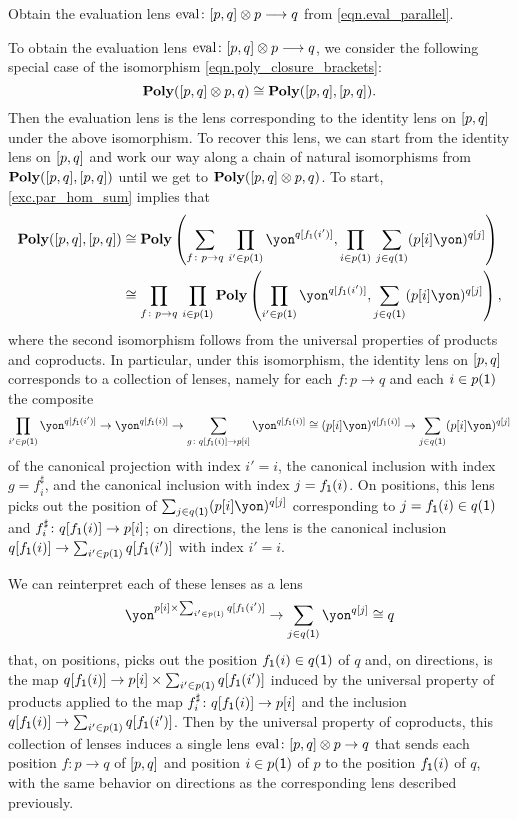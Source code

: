 \documentclass[Book-Poly]{subfiles}
\begin{document}
\begin{exercise} \label{exc.eval_parallel}
Obtain the evaluation lens $\mathrm{eval}\colon [p,q]\otimes p\longrightarrow q$ from \eqref{eqn.eval_parallel}.
\begin{solution}
To obtain the evaluation lens $\mathrm{eval}\colon [p,q]\otimes p\longrightarrow q$, we consider the following special case of the isomorphism \eqref{eqn.poly_closure_brackets}:
\[
    \mathbf{Poly}([p,q] \otimes p, q) \cong \mathbf{Poly}([p,q], [p,q]).
\]
Then the evaluation lens is the lens corresponding to the identity lens on $[p,q]$ under the above isomorphism.
To recover this lens, we can start from the identity lens on $[p,q]$ and work our way along a chain of natural isomorphisms from $\mathbf{Poly}([p,q], [p,q])$ until we get to $\mathbf{Poly}([p,q] \otimes p, q)$.
To start, \cref{exc.par_hom_sum} implies that
\begin{align*}
    \poly(\ihom{p,q}, \ihom{p,q})
    &\iso
    \poly\left(\sum_{f \colon p \to q} \, \prod_{i' \in p(\1)} \yon^{q[f_\1(i')]}, \prod_{i \in p(\1)} \, \sum_{j \in q(\1)} (p[i]\yon)^{q[j]}\right) \\
    &\iso
    \prod_{f \colon p \to q} \, \prod_{i \in p(\1)} \poly\left(\prod_{i' \in p(\1)} \yon^{q[f_\1(i')]}, \sum_{j \in q(\1)} (p[i]\yon)^{q[j]}\right),
\end{align*}
where the second isomorphism follows from the universal properties of products and coproducts.
In particular, under this isomorphism, the identity lens on $[p,q]$ corresponds to a collection of lenses, namely for each $f \colon p \to q$ and each $i \in p(\textsf{1})$ the composite
\[
    \prod_{i' \in p(\1)} \yon^{q[f_\1(i')]} \to \yon^{q[f_\1(i)]} \to \sum_{g \colon q[f_\1(i)] \to p[i]} \yon^{q[f_\1(i)]} \iso (p[i]\yon)^{q[f_\1(i)]} \to \sum_{j \in q(\1)} (p[i]\yon)^{q[j]}
\]
of the canonical projection with index $i' = i$, the canonical inclusion with index $g = f^\sharp_i$, and the canonical inclusion with index $j = f_{\textsf{1}}(i)$.
On positions, this lens picks out the position of $\sum_{j \in q(\1)} (p[i]\yon)^{q[j]}$ corresponding to $j = f_{\textsf{1}}(i) \in q(\textsf{1})$ and $f^\sharp_i \colon q[f_{\textsf{1}}(i)] \to p[i]$; on directions, the lens is the canonical inclusion $q[f_{\textsf{1}}(i)] \to \sum_{i' \in p(\textsf{1})} q[f_{\textsf{1}}(i')]$ with index $i' = i$.

We can reinterpret each of these lenses as a lens
\[
    \yon^{p[i] \times \sum_{i' \in p(\1)} q[f_\1(i')]} \to \sum_{j \in q(\1)} \yon^{q[j]} \iso q
\]
that, on positions, picks out the position $f_{\textsf{1}}(i) \in q(\textsf{1})$ of $q$ and, on directions, is the map $q[f_{\textsf{1}}(i)] \to p[i] \times \sum_{i' \in p(\textsf{1})} q[f_{\textsf{1}}(i')]$ induced by the universal property of products applied to the map $f^\sharp_i \colon q[f_{\textsf{1}}(i)] \to p[i]$ and the inclusion $q[f_{\textsf{1}}(i)] \to \sum_{i' \in p(\textsf{1})} q[f_{\textsf{1}}(i')]$.
Then by the universal property of coproducts, this collection of lenses induces a single lens $\mathrm{eval} \colon [p, q] \otimes p \to q$ that sends each position $f \colon p \to q$ of $[p,q]$ and position $i \in p(\textsf{1})$ of $p$ to the position $f_{\textsf{1}}(i)$ of $q$, with the same behavior on directions as the corresponding lens described previously.
\end{solution}
\end{exercise}
\end{document}
